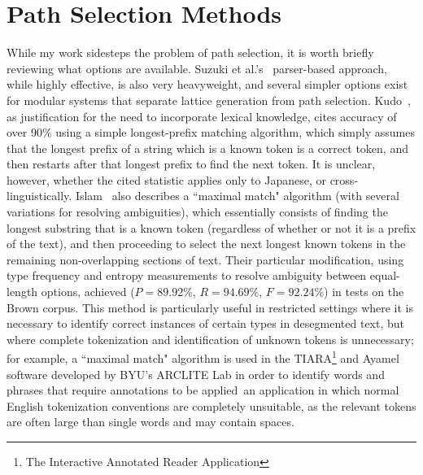\section{Path Selection Methods}
While my work sidesteps the problem of path selection, it is worth briefly reviewing what options are available. Suzuki et al.'s~\cite{suzuki00} parser-based approach, while highly effective, is also very heavyweight, and several simpler options exist for modular systems that separate lattice generation from path selection. Kudo~\cite{kudo04}, as justification for the need to incorporate lexical knowledge, cites accuracy of over 90\% using a simple longest-prefix matching algorithm, which simply assumes that the longest prefix of a string which is a known token is a correct token, and then restarts after that longest prefix to find the next token. It is unclear, however, whether the cited statistic applies only to Japanese, or cross-linguistically. Islam~\cite{islam07} also describes a ``maximal match" algorithm (with several variations for resolving ambiguities), which essentially consists of finding the longest substring that is a known token (regardless of whether or not it is a prefix of the text), and then proceeding to select the next longest known tokens in the remaining non-overlapping sections of text. Their particular modification, using type frequency and entropy measurements to resolve ambiguity between equal-length options, achieved ($P = 89.92\%$, $R = 94.69\%$, $F = 92.24\%$) in tests on the Brown corpus. This method is particularly useful in restricted settings where it is necessary to identify correct instances of certain types in desegmented text, but where complete tokenization and identification of unknown tokens is unnecessary; for example, a ``maximal match" algorithm is used in the TIARA\footnote{The Interactive Annotated Reader Application} \cite{cloe12} and Ayamel \cite{todd14} software developed by BYU's ARCLITE Lab in order to identify words and phrases that require annotations to be applied\textemdash~an application in which normal English tokenization conventions are completely unsuitable, as the relevant tokens are often large than single words and may contain spaces.
